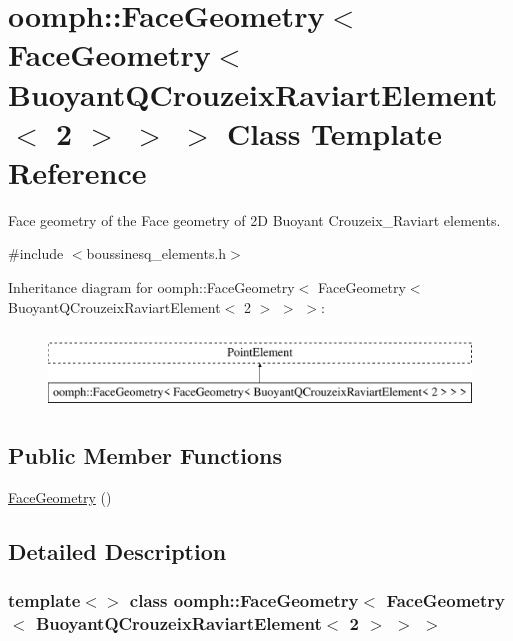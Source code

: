 \hypertarget{classoomph_1_1FaceGeometry_3_01FaceGeometry_3_01BuoyantQCrouzeixRaviartElement_3_012_01_4_01_4_01_4}{}\section{oomph\+:\+:Face\+Geometry$<$ Face\+Geometry$<$ Buoyant\+Q\+Crouzeix\+Raviart\+Element$<$ 2 $>$ $>$ $>$ Class Template Reference}
\label{classoomph_1_1FaceGeometry_3_01FaceGeometry_3_01BuoyantQCrouzeixRaviartElement_3_012_01_4_01_4_01_4}


Face geometry of the Face geometry of 2D Buoyant Crouzeix\+\_\+\+Raviart elements.  




{\ttfamily \#include $<$boussinesq\+\_\+elements.\+h$>$}

Inheritance diagram for oomph\+:\+:Face\+Geometry$<$ Face\+Geometry$<$ Buoyant\+Q\+Crouzeix\+Raviart\+Element$<$ 2 $>$ $>$ $>$\+:\begin{figure}[H]
\begin{center}
\leavevmode
\includegraphics[height=2.000000cm]{classoomph_1_1FaceGeometry_3_01FaceGeometry_3_01BuoyantQCrouzeixRaviartElement_3_012_01_4_01_4_01_4}
\end{center}
\end{figure}
\subsection*{Public Member Functions}
\begin{DoxyCompactItemize}
\item 
\hyperlink{classoomph_1_1FaceGeometry_3_01FaceGeometry_3_01BuoyantQCrouzeixRaviartElement_3_012_01_4_01_4_01_4_af5838040ad0b4b6d95435e65abc2888c}{Face\+Geometry} ()
\end{DoxyCompactItemize}


\subsection{Detailed Description}
\subsubsection*{template$<$$>$\newline
class oomph\+::\+Face\+Geometry$<$ Face\+Geometry$<$ Buoyant\+Q\+Crouzeix\+Raviart\+Element$<$ 2 $>$ $>$ $>$}

